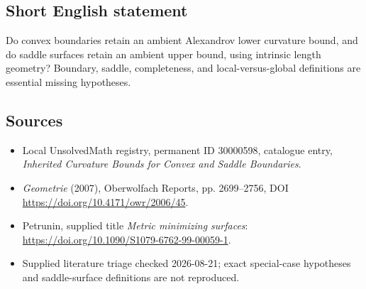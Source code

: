 \documentclass[11pt]{article}
\begin{document}
\subsection{Short English statement}
Do convex boundaries retain an ambient Alexandrov lower curvature bound, and do saddle surfaces retain an ambient upper bound, using intrinsic length geometry? Boundary, saddle, completeness, and local-versus-global definitions are essential missing hypotheses.
\subsection{Sources}
\begin{itemize}
\item Local UnsolvedMath registry, permanent ID 30000598, catalogue entry, \emph{Inherited Curvature Bounds for Convex and Saddle Boundaries}.
\item \emph{Geometrie} (2007), Oberwolfach Reports, pp. 2699--2756, DOI \url{https://doi.org/10.4171/owr/2006/45}.
\item Petrunin, supplied title \emph{Metric minimizing surfaces}: \url{https://doi.org/10.1090/S1079-6762-99-00059-1}.
\item Supplied literature triage checked 2026-08-21; exact special-case hypotheses and saddle-surface definitions are not reproduced.
\end{itemize}
\end{document}
